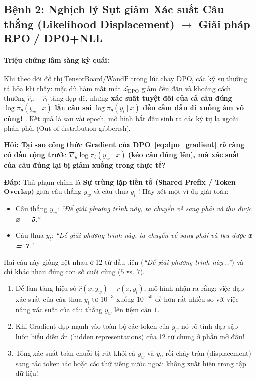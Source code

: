 \subsection{Bệnh 2: Nghịch lý Sụt giảm Xác suất Câu thắng (Likelihood Displacement) \texorpdfstring{$\longrightarrow$}{->} Giải pháp RPO / DPO+NLL}

\paragraph{Triệu chứng lâm sàng kỳ quái:}
Khi theo dõi đồ thị TensorBoard/WandB trong lúc chạy DPO, các kỹ sư thường tá hỏa khi thấy: mặc dù hàm mất mát $\mathcal{L}_{\text{DPO}}$ giảm đều đặn và khoảng cách thưởng $\hat{r}_w - \hat{r}_l$ tăng đẹp đẽ, nhưng \textbf{xác suất tuyệt đối của cả câu đúng $\log \pi_\theta(y_w \mid x)$ lẫn câu sai $\log \pi_\theta(y_l \mid x)$ đều cắm đầu đi xuống âm vô cùng!} \citep{pal2024smaug, razin2024unintentional}. Kết quả là sau vài epoch, mô hình bắt đầu sinh ra các ký tự lạ ngoài phân phối (Out-of-distribution gibberish).

\begin{debate}
\textbf{Hỏi: Tại sao công thức Gradient của DPO~\eqref{eq:dpo_gradient} rõ ràng có dấu cộng trước $\nabla_\theta \log \pi_\theta(y_w \mid x)$ (kéo câu đúng lên), mà xác suất của câu đúng lại bị giảm xuống trong thực tế?}

\textbf{Đáp:} Thủ phạm chính là \textbf{Sự trùng lặp tiền tố (Shared Prefix / Token Overlap)} giữa câu thắng $y_w$ và câu thua $y_l$ \citep{razin2024unintentional, pal2024smaug}!
Hãy xét một ví dụ giải toán:
\begin{itemize}
  \item Câu thắng $y_w$: \textit{``Để giải phương trình này, ta chuyển vế sang phải và thu được \textbf{x = 5}.''}
  \item Câu thua $y_l$: \textit{``Để giải phương trình này, ta chuyển vế sang phải và thu được \textbf{x = 7}.''}
\end{itemize}
Hai câu này giống hệt nhau ở 12 từ đầu tiên (\textit{``Để giải phương trình này...''}) và chỉ khác nhau đúng con số cuối cùng ($5$ vs. $7$).
\begin{enumerate}
  \item Để làm tăng hiệu số $\hat{r}(x, y_w) - \hat{r}(x, y_l)$, mô hình nhận ra rằng: việc đạp xác suất của câu thua $y_l$ từ $10^{-3}$ xuống $10^{-50}$ dễ hơn rất nhiều so với việc nâng xác suất của câu thắng $y_w$ lên tiệm cận $1$.
  \item Khi Gradient đạp mạnh vào toàn bộ các token của $y_l$, nó vô tình đạp sập luôn biểu diễn ẩn (hidden representations) của 12 từ chung ở phần mở đầu!
  \item Tổng xác suất toàn chuỗi bị rút khỏi cả $y_w$ và $y_l$, rồi chảy tràn (displacement) sang các token rác hoặc các thứ tiếng nước ngoài không xuất hiện trong tập dữ liệu!
\end{enumerate}
\end{debate}


